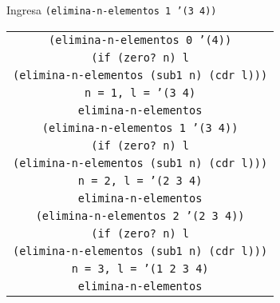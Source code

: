 \documentclass[letterpaper,11pt]{article}
\begin{document}
\begin{enumerate}
\begin{enumerate}
        \newpage
        Ingresa \texttt{(elimina-n-elementos 1 '(3 4))}
        \begin{center}
            \begin{tabular}[h]{|c|}
                \hline
                \texttt{(elimina-n-elementos 0 '(4))} \\
                \texttt{(if (zero? n) l} \\
                \texttt{(elimina-n-elementos (sub1 n) (cdr l)))} \\
                \texttt{n = 1, l = '(3 4)} \\
                \texttt{elimina-n-elementos} \\
                \hline
                \hline
                \texttt{(elimina-n-elementos 1 '(3 4))} \\
                \texttt{(if (zero? n) l} \\
                \texttt{(elimina-n-elementos (sub1 n) (cdr l)))} \\
                \texttt{n = 2, l = '(2 3 4)} \\
                \texttt{elimina-n-elementos} \\
                \hline
                \hline
                \texttt{(elimina-n-elementos 2 '(2 3 4))} \\
                \texttt{(if (zero? n) l} \\
                \texttt{(elimina-n-elementos (sub1 n) (cdr l)))} \\
                \texttt{n = 3, l = '(1 2 3 4)} \\
                \texttt{elimina-n-elementos} \\
                \hline
            \end{tabular}
        \end{center}


\end{enumerate}
\end{enumerate}
\end{document}

